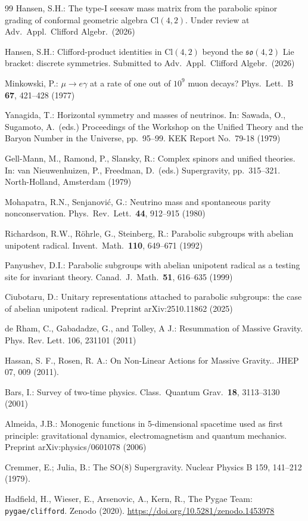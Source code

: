 \documentclass{birkjour}
\theoremstyle{definition}
\theoremstyle{remark}
\numberwithin{equation}{section}
\newcommand{\Cl}{\mathrm{Cl}}
\newcommand{\so}{\mathfrak{so}}
\providecommand{\rev}{{}}
\begin{document}
\begin{thebibliography}{99}
Hansen, S.H.:
The type-I seesaw mass matrix from the parabolic spinor
grading of conformal geometric algebra $\Cl(4,2)$.
\rev{Under review at} Adv.\ Appl.\ Clifford Algebr.\ (2026)

Hansen, S.H.:
Clifford-product identities in $\Cl(4,2)$ beyond the
$\so(4,2)$ Lie bracket: discrete symmetries.
Submitted to Adv.\ Appl.\ Clifford Algebr.\ (2026)

Minkowski, P.:
$\mu\to e\gamma$ at a rate of one out of $10^9$ muon decays?
Phys.\ Lett.\ B \textbf{67}, 421--428 (1977)

Yanagida, T.:
Horizontal symmetry and masses of neutrinos.
In: Sawada, O., Sugamoto, A.\ (eds.)
Proceedings of the Workshop on the Unified Theory and
the Baryon Number in the Universe, pp.~95--99.
KEK Report No.~79-18 (1979)

Gell-Mann, M., Ramond, P., Slansky, R.:
Complex spinors and unified theories.
In: van Nieuwenhuizen, P., Freedman, D.\ (eds.)
Supergravity, pp.~315--321.
North-Holland, Amsterdam (1979)

Mohapatra, R.N., Senjanovi\'c, G.:
Neutrino mass and spontaneous parity nonconservation.
Phys.\ Rev.\ Lett.\ \textbf{44}, 912--915 (1980)

Richardson, R.W., R\"ohrle, G., Steinberg, R.:
Parabolic subgroups with abelian unipotent radical.
Invent.\ Math.\ \textbf{110}, 649--671 (1992)

Panyushev, D.I.:
Parabolic subgroups with abelian unipotent radical as a
testing site for invariant theory.
Canad.\ J.\ Math.\ \textbf{51}, 616--635 (1999)

Ciubotaru, D.:
Unitary representations attached to parabolic subgroups:
the case of abelian unipotent radical.
Preprint arXiv:2510.11862 (2025)

de Rham, C., Gabadadze, G., and Tolley, A J.:
Resummation of Massive Gravity.
Phys. Rev. Lett. 106, 231101 (2011)

Hassan, S. F., Rosen, R. A.:
On Non-Linear Actions for Massive Gravity..
JHEP 07, 009 (2011).

Bars, I.:
Survey of two-time physics.
Class.\ Quantum Grav.\ \textbf{18}, 3113--3130 (2001)

Almeida, J.B.:
Monogenic functions in 5-dimensional spacetime used as
first principle: gravitational dynamics, electromagnetism
and quantum mechanics.
Preprint arXiv:physics/0601078 (2006)

Cremmer, E.; Julia, B.:
The SO(8) Supergravity.
Nuclear Physics B 159, 141–212 (1979).

Hadfield, H., Wieser, E., Arsenovic, A., Kern, R.,
The Pygae Team:
\texttt{pygae/clifford}.
Zenodo (2020).
\url{https://doi.org/10.5281/zenodo.1453978}



\end{thebibliography}
\end{document}
